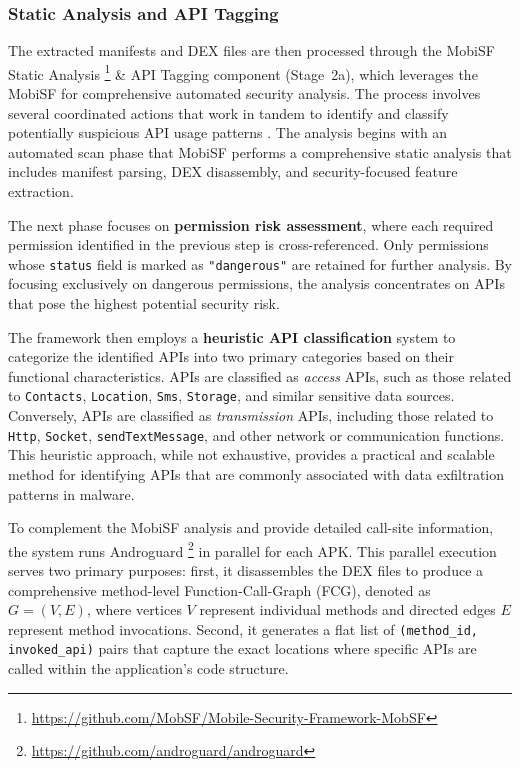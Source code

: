 \documentclass[runningheads]{llncs}
\begin{document}
\subsubsection{Static Analysis and API Tagging}
The extracted manifests and DEX files are then processed through the MobiSF Static Analysis \footnote{\url{https://github.com/MobSF/Mobile-Security-Framework-MobSF}} \& API Tagging component (Stage~2a), which leverages the MobiSF for comprehensive automated security analysis. The process involves several coordinated actions that work in tandem to identify and classify potentially suspicious API usage patterns \cite{amer2020dynamic,qiu2022cyber}.
The analysis begins with an automated scan phase that MobiSF performs a comprehensive static analysis that includes manifest parsing, DEX disassembly, and security-focused feature extraction. 

The next phase focuses on \textbf{permission risk assessment}, where each required permission identified in the previous step is cross-referenced. Only permissions whose \texttt{status} field is marked as \texttt{"dangerous"} are retained for further analysis. By focusing exclusively on dangerous permissions, the analysis concentrates on APIs that pose the highest potential security risk.

The framework then employs a \textbf{heuristic API classification} system to categorize the identified APIs into two primary categories based on their functional characteristics. APIs are classified as \textit{access} APIs, such as those related to \texttt{Contacts}, \texttt{Location}, \texttt{Sms}, \texttt{Storage}, and similar sensitive data sources. Conversely, APIs are classified as \textit{transmission} APIs, including those related to \texttt{Http}, \texttt{Socket}, \texttt{sendTextMessage}, and other network or communication functions. This heuristic approach, while not exhaustive, provides a practical and scalable method for identifying APIs that are commonly associated with data exfiltration patterns in malware.

To complement the MobiSF analysis and provide detailed call-site information, the system runs Androguard \footnote{\url{https://github.com/androguard/androguard}} in parallel for each APK. This parallel execution serves two primary purposes: first, it disassembles the DEX files to produce a comprehensive method-level Function-Call-Graph (FCG), denoted as $G=(V,E)$, where vertices $V$ represent individual methods and directed edges $E$ represent method invocations. Second, it generates a flat list of \texttt{(method\_id, invoked\_api)} pairs that capture the exact locations where specific APIs are called within the application's code structure.
\end{document}
